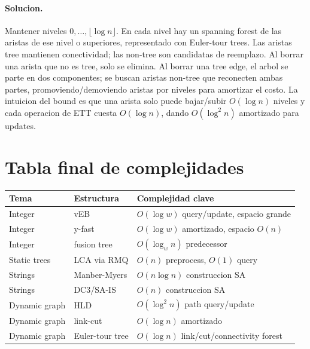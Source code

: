 \documentclass[10pt]{article}
\newcommand{\bigO}{O}
\begin{document}
\paragraph{Solucion.}
Mantener niveles $0,\ldots,\lfloor\log n\rfloor$. En cada nivel hay un spanning
forest de las aristas de ese nivel o superiores, representado con Euler-tour
trees. Las aristas tree mantienen conectividad; las non-tree son candidatas de
reemplazo. Al borrar una arista que no es tree, solo se elimina. Al borrar una
tree edge, el arbol se parte en dos componentes; se buscan aristas non-tree que
reconecten ambas partes, promoviendo/demoviendo aristas por niveles para amortizar
el costo. La intuicion del bound es que una arista solo puede bajar/subir
$\bigO(\log n)$ niveles y cada operacion de ETT cuesta $\bigO(\log n)$, dando
$\bigO(\log^2 n)$ amortizado para updates.

\section*{Tabla final de complejidades}
\begin{center}
\begin{tabular}{lll}
\toprule
Tema & Estructura & Complejidad clave \\
\midrule
Integer & vEB & $\bigO(\log w)$ query/update, espacio grande \\
Integer & y-fast & $\bigO(\log w)$ amortizado, espacio $\bigO(n)$ \\
Integer & fusion tree & $\bigO(\log_w n)$ predecessor \\
Static trees & LCA via RMQ & $\bigO(n)$ preprocess, $\bigO(1)$ query \\
Strings & Manber-Myers & $\bigO(n\log n)$ construccion SA \\
Strings & DC3/SA-IS & $\bigO(n)$ construccion SA \\
Dynamic graph & HLD & $\bigO(\log^2 n)$ path query/update \\
Dynamic graph & link-cut & $\bigO(\log n)$ amortizado \\
Dynamic graph & Euler-tour tree & $\bigO(\log n)$ link/cut/connectivity forest \\
\bottomrule
\end{tabular}
\end{center}
\end{document}
